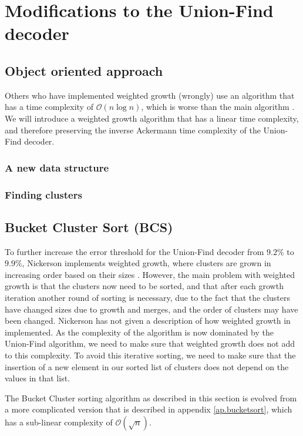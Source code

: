 \chapter{Modifications to the Union-Find decoder}


\section{Object oriented approach}

Others who have implemented weighted growth (wrongly) use an algorithm that has a time complexity of $\mathcal{O}(n\log n)$, which is worse than the main algorithm \cite{nando}. We will introduce a weighted growth algorithm that has a linear time complexity, and therefore preserving the inverse Ackermann time complexity of the Union-Find decoder.

\subsection{A new data structure}

\subsection{Finding clusters}

\section{Bucket Cluster Sort (BCS)}
To further increase the error threshold for the Union-Find decoder from $9.2\%$ to $9.9\%$, Nickerson implements weighted growth, where clusters are grown in increasing order based on their sizes \cite{delfosse2017}. However, the main problem with weighted growth is that the clusters now need to be sorted, and that after each growth iteration another round of sorting is necessary, due to the fact that the clusters have changed sizes due to growth and merges, and the order of clusters may have been changed. Nickerson has not given a description of how weighted growth in implemented. As the complexity of the algorithm is now dominated by the Union-Find algorithm, we need to make sure that weighted growth does not add to this complexity. To avoid this iterative sorting, we need to make sure that the insertion of a new element in our sorted list of clusters does not depend on the values in that list.

The Bucket Cluster sorting algorithm as described in this section is evolved from a more complicated version that is described in appendix \ref{ap.bucketsort}, which has a sub-linear complexity of $\mathcal{O}(\sqrt{n})$.

